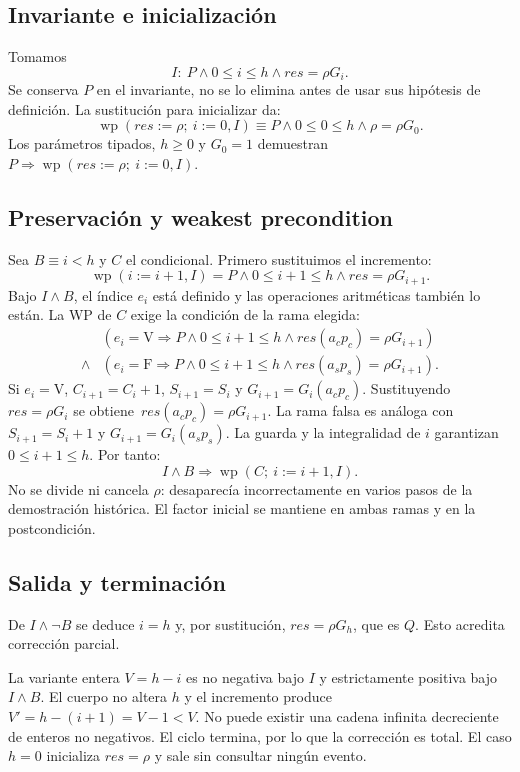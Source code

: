 \documentclass[11pt,a4paper]{article}
\newcommand{\wpof}[2]{\operatorname{wp}(#1,#2)}
\begin{document}
\subsection{Invariante e inicialización}
Tomamos
\[
 I:\ P\land 0\leq i\leq h\land res=\rho G_i.
\]
Se conserva $P$ en el invariante, no se lo elimina antes de usar sus
hipótesis de definición. La sustitución para inicializar da:
\[
 \wpof{res:=\rho;\ i:=0}{I}
 \equiv P\land 0\leq0\leq h\land\rho=\rho G_0.
\]
Los parámetros tipados, $h\geq0$ y $G_0=1$ demuestran
$P\Rightarrow\wpof{res:=\rho;\ i:=0}{I}$.

\subsection{Preservación y weakest precondition}
Sea $B\equiv i<h$ y $C$ el condicional. Primero sustituimos el incremento:
\[
 \wpof{i:=i+1}{I}=
 P\land 0\leq i+1\leq h\land res=\rho G_{i+1}.
\]
Bajo $I\land B$, el índice $e_i$ está definido y las operaciones aritméticas
también lo están. La WP de $C$ exige la condición de la rama elegida:
\[
 \begin{aligned}
 &(e_i=\mathrm V\Rightarrow
       P\land 0\leq i+1\leq h\land res(a_cp_c)=\rho G_{i+1})\\
 {}\land{}&
 (e_i=\mathrm F\Rightarrow
       P\land 0\leq i+1\leq h\land res(a_sp_s)=\rho G_{i+1}).
 \end{aligned}
\]
Si $e_i=\mathrm V$, $C_{i+1}=C_i+1$, $S_{i+1}=S_i$ y
$G_{i+1}=G_i(a_cp_c)$. Sustituyendo $res=\rho G_i$ se obtiene
$\,res(a_cp_c)=\rho G_{i+1}$. La rama falsa es análoga con
$S_{i+1}=S_i+1$ y $G_{i+1}=G_i(a_sp_s)$.
La guarda y la integralidad de $i$ garantizan $0\leq i+1\leq h$.
Por tanto:
\[
 I\land B\Rightarrow\wpof{C;\ i:=i+1}{I}.
\]
No se divide ni cancela $\rho$: desaparecía incorrectamente en varios
pasos de la demostración histórica. El factor inicial se mantiene en
ambas ramas y en la postcondición.

\subsection{Salida y terminación}
De $I\land\neg B$ se deduce $i=h$ y, por sustitución,
$res=\rho G_h$, que es $Q$. Esto acredita corrección parcial.

La variante entera $V=h-i$ es no negativa bajo $I$ y estrictamente positiva
bajo $I\land B$. El cuerpo no altera $h$ y el incremento produce
$V'=h-(i+1)=V-1<V$. No puede existir una cadena infinita decreciente de
enteros no negativos. El ciclo termina, por lo que la corrección es total.
El caso $h=0$ inicializa $res=\rho$ y sale sin consultar ningún evento.
\end{document}
